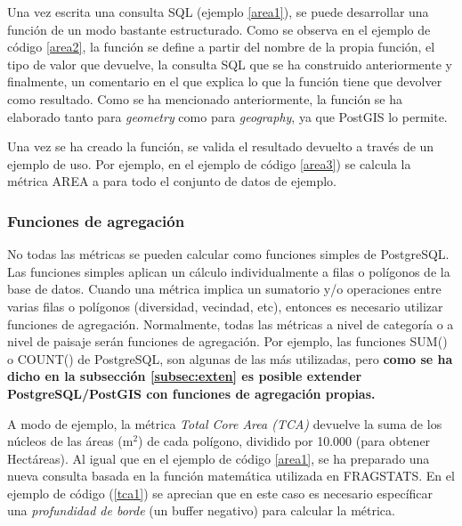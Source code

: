 

Una vez escrita una consulta SQL (ejemplo \ref{area1}), se puede desarrollar una función de un modo bastante estructurado. Como se observa en el ejemplo de código \ref{area2}, la función se define a partir del nombre de la propia función, el tipo de valor que devuelve, la consulta SQL que se ha construido anteriormente y finalmente, un comentario en el que explica lo que la función tiene que devolver como resultado. Como se ha mencionado anteriormente, la función se ha elaborado tanto para \textit{geometry} como para \textit{geography}, ya que PostGIS lo permite.



Una vez se ha creado la función, se valida el resultado devuelto a través de un ejemplo de uso. Por ejemplo, en el ejemplo de código \ref{area3}) se calcula la métrica AREA a para todo el conjunto de datos de ejemplo.




\subsubsection{Funciones de agregación}

No todas las métricas se pueden calcular como funciones simples de PostgreSQL. Las funciones simples aplican un cálculo individualmente a filas o polígonos de la base de datos. Cuando una métrica implica un sumatorio y/o operaciones entre varias filas o polígonos (diversidad, vecindad, etc), entonces es necesario utilizar funciones de agregación. Normalmente, todas las métricas a nivel de categoría o a nivel de paisaje serán funciones de agregación. Por ejemplo, las funciones SUM() o COUNT() de PostgreSQL, son algunas de las más utilizadas, pero \textbf{como se ha dicho en la subsección \ref{subsec:exten} es posible extender PostgreSQL/PostGIS con funciones de agregación propias.}

A modo de ejemplo, la métrica \textit{Total Core Area (TCA)} devuelve la suma de los núcleos de las áreas (m$ ^{2} $) de cada polígono, dividido por 10.000 (para obtener Hectáreas). Al igual que en el ejemplo de código \ref{area1}, se ha preparado una nueva consulta basada en la función matemática utilizada en FRAGSTATS. En el ejemplo de código (\ref{tca1}) se aprecian que en este caso es necesario específicar una \textit{profundidad de borde} (un buffer negativo) para calcular la métrica.

